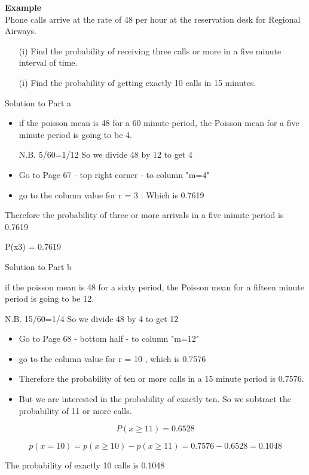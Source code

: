 \documentclass[]{report}
\begin{document}
\noindent \textbf{Example}\\
Phone calls arrive at the rate of 48 per hour at the reservation desk for Regional Airways.
\begin{itemize}
\item[(i)]  Find the probability of receiving  three calls or more in a five minute interval of time.
\item[(i)] Find the probability of getting exactly 10 calls in 15 minutes.
\end{itemize}
Solution to Part a

\begin{itemize}
\item if the poisson mean  is 48 for a 60 minute period, the Poisson mean for a five minute period is going to be 4.

N.B.   5/60=1/12          So we divide 48 by 12 to get 4

\item Go to Page 67  - top right corner - to column "m=4"

\item go to the column value for r = 3 . Which is 0.7619
\end{itemize} 
Therefore the probability of three or more arrivals in a five minute period is 0.7619

P(x3) = 0.7619 

Solution to Part b

if the poisson mean  is 48 for a sixty period, the Poisson mean for a fifteen minute period is going to be 12.

N.B.   15/60=1/4          So we divide 48 by 4 to get 12

\begin{itemize}
\item Go to Page 68  - bottom half - to column "m=12"
\item go to the column value for r = 10 , which is 0.7576
\item Therefore the probability of ten or more calls in a 15 minute period is 0.7576.
\item But we are interested in the probability of exactly ten. So we subtract the probability of 11 or more calls.
\end{itemize}
\[P(x \geq 11) = 0.6528\]

\[p(x =10) = p(x \geq 10) - p( x \geq 11) = 0.7576 -0.6528 = 0.1048\]

The probability of exactly 10 calls is 0.1048 


\end{document}

